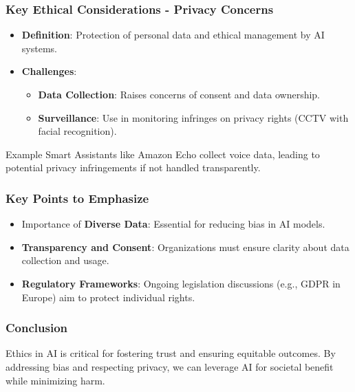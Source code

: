 \documentclass[aspectratio=169]{beamer}
\begin{document}
\begin{frame}[fragile]
    \frametitle{Key Ethical Considerations - Privacy Concerns}
    \begin{itemize}
        \item \textbf{Definition}: Protection of personal data and ethical management by AI systems.
        \item \textbf{Challenges}:
            \begin{itemize}
                \item \textbf{Data Collection}: Raises concerns of consent and data ownership.
                \item \textbf{Surveillance}: Use in monitoring infringes on privacy rights (CCTV with facial recognition).
            \end{itemize}
    \end{itemize}
    \begin{block}{Example}
        Smart Assistants like Amazon Echo collect voice data, leading to potential privacy infringements if not handled transparently.
    \end{block}
\end{frame}

\begin{frame}[fragile]
    \frametitle{Key Points to Emphasize}
    \begin{itemize}
        \item Importance of \textbf{Diverse Data}: Essential for reducing bias in AI models.
        \item \textbf{Transparency and Consent}: Organizations must ensure clarity about data collection and usage.
        \item \textbf{Regulatory Frameworks}: Ongoing legislation discussions (e.g., GDPR in Europe) aim to protect individual rights.
    \end{itemize}
\end{frame}

\begin{frame}[fragile]
    \frametitle{Conclusion}
    Ethics in AI is critical for fostering trust and ensuring equitable outcomes. 
    By addressing bias and respecting privacy, we can leverage AI for societal benefit while minimizing harm.
\end{frame}
\end{document}
